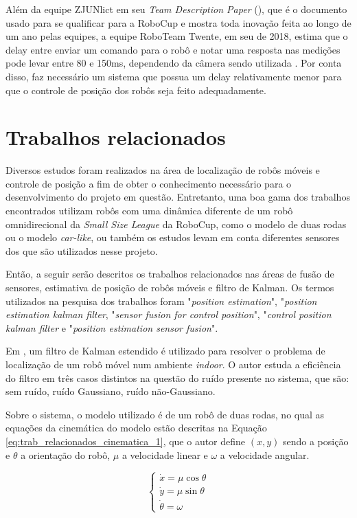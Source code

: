 \documentclass[acronym, symbols]{fei}
\begin{document}
		Além da equipe ZJUNlict em seu \textit{Team Description Paper} (), que é o documento usado para se qualificar para a RoboCup e mostra toda inovação feita ao longo de um ano pelas equipes, a equipe RoboTeam Twente, em seu  de 2018, estima que o delay entre enviar um comando para o robô e notar uma resposta nas medições pode levar entre 80 e 150ms, dependendo da câmera sendo utilizada \cite{tdptwente2018}. Por conta disso, faz necessário um sistema que possua um delay relativamente menor para que o controle de posição dos robôs seja feito adequadamente. 
		
\chapter{Trabalhos relacionados}
	Diversos estudos foram realizados na área de localização de robôs móveis e controle de posição a fim de obter o conhecimento necessário para o desenvolvimento do projeto em questão. Entretanto, uma boa gama dos trabalhos encontrados utilizam robôs com uma dinâmica diferente de um robô omnidirecional da \textit{Small Size League} da RoboCup, como o modelo de duas rodas ou o modelo \textit{car-like}, ou também os estudos levam em conta diferentes sensores dos que são utilizados nesse projeto.
	
	Então, a seguir serão descritos os trabalhos relacionados nas áreas de fusão de sensores, estimativa de posição de robôs móveis e filtro de Kalman. Os termos utilizados na pesquisa dos trabalhos foram "\textit{position estimation}", "\textit{position estimation kalman filter}, "\textit{sensor fusion for control position}", "\textit{control position kalman filter} e "\textit{position estimation sensor fusion}".
	
	Em \textcite{eman2020mobile}, um filtro de Kalman estendido é utilizado para resolver o problema de localização de um robô móvel num ambiente \textit{indoor}. O autor estuda a eficiência do filtro em três casos distintos na questão do ruído presente no sistema, que são: sem ruído, ruído Gaussiano, ruído não-Gaussiano.
	
	Sobre o sistema, o modelo utilizado é de um robô de duas rodas, no qual as equações da cinemática do modelo estão descritas na Equação \eqref{eq:trab_relacionados_cinematica_1}, que o autor define $(x, y)$ sendo a posição e $\theta$ a orientação do robô, $\mu$ a velocidade linear e $\omega$ a velocidade angular.
	
	\begin{equation}\label{eq:trab_relacionados_cinematica_1}
		\begin{cases}
			\dot{x} = \mu \cos{\theta} \\
			\dot{y} = \mu \sin{\theta} \\
			\dot{\theta} = \omega
		\end{cases}
	\end{equation}
	
\end{document}
